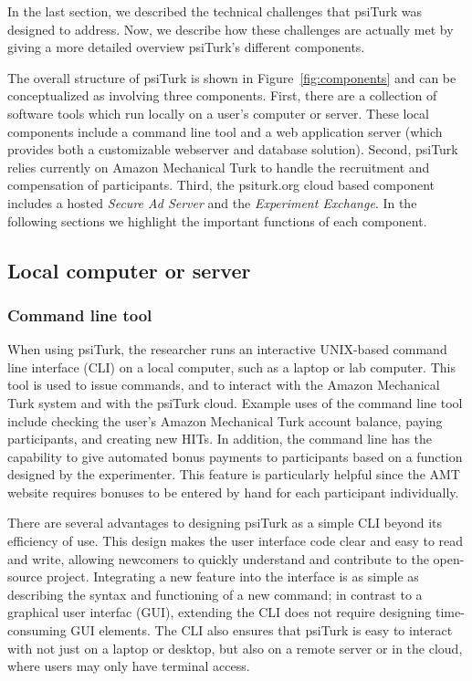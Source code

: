 \documentclass[twocolumn]{svjour3}          %
\newcommand{\psiturk}[0]{\textsf{psiTurk}}
\begin{document}
In the last section, we described the technical challenges that \psiturk{} was designed to address. Now, we describe how these challenges are actually met by giving a more detailed overview \psiturk{}'s different components.

The overall structure of \psiturk{} is shown in Figure~\ref{fig:components}
and can be conceptualized as involving three components.
First, there are a collection of software tools which run locally on a user's
 computer or server.  These local components include a command line tool and 
a web application server (which provides both a customizable webserver and 
database solution).  Second, \psiturk{} relies currently on Amazon
Mechanical Turk to handle the recruitment and compensation of participants.
Third, the \textsf{psiturk.org} cloud based component includes a hosted \emph{Secure Ad Server}
and the \emph{Experiment Exchange}.  In the following sections we highlight the important 
functions of each component.

\subsection{Local computer or server}

\subsubsection{Command line tool}
\label{sec:cli}

When using \psiturk{}, the researcher runs an
interactive UNIX-based command line interface (CLI) on a local computer, such as a laptop
or lab computer. This tool is used to issue commands, and to interact with the
Amazon Mechanical Turk system and with the \psiturk{} cloud.  Example
uses of the command line tool include checking the user's Amazon Mechanical
Turk account balance, paying participants, and creating new HITs. In addition,
the command line has the capability to give automated bonus payments to
participants based on a function designed by the experimenter. This feature is
particularly helpful since the AMT website requires bonuses to be entered by
hand for each participant individually.

There are several advantages to designing \psiturk{} as a simple CLI beyond its
efficiency of use. This design makes the user interface code clear and easy to
read and write, allowing newcomers to quickly understand and contribute to the
open-source project. Integrating a new feature into the interface is as simple
as describing the syntax and functioning of a new command; in contrast to a
graphical user interfac (GUI), extending the CLI does not require designing
time-consuming GUI elements.  The CLI also ensures that \psiturk{} is easy to
interact with not just on a laptop or desktop, but also on a remote server or
in the cloud, where users may only have terminal access.
\end{document}
